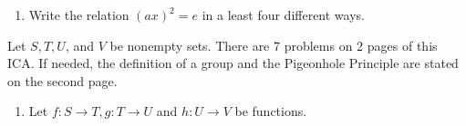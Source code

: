 \begin{enumerate}
\begin{enumerate}
\begin{subanswer}
    \end{subanswer}
    \item Write the relation $(a x)^{2}=e$ in a least four different ways.
    \begin{subanswer}
      
    \end{subanswer}
  \end{enumerate}






\end{enumerate}










\newpage

Let $S, T, U$, and $V$ be nonempty sets. There are 7 problems on 2 pages of this ICA. If needed, the definition of a group and the Pigeonhole Principle are stated on the second page.

\begin{enumerate}
  \item Let $f: S \rightarrow T, g: T \rightarrow U$ and $h: U \rightarrow V$ be functions.
\end{enumerate}

